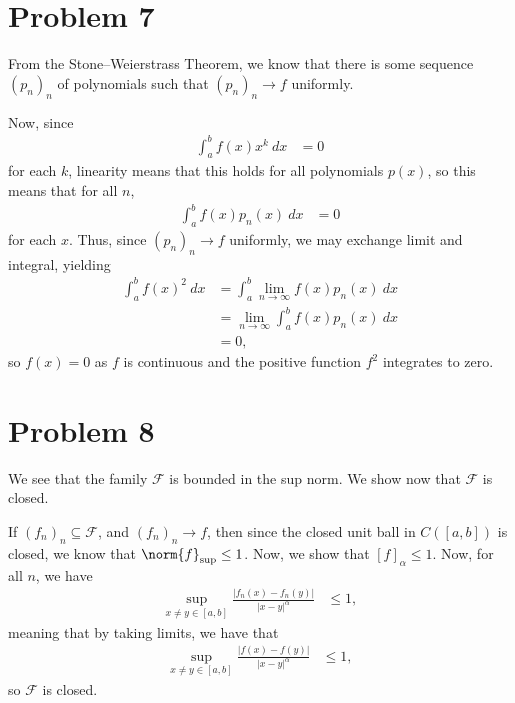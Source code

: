 \documentclass[10pt]{mypackage}
\begin{document}
\RaggedRight
\section{Problem 7}%
From the Stone--Weierstrass Theorem, we know that there is some sequence $\left( p_n \right)_n$ of polynomials such that $\left( p_n \right)_n\rightarrow f$ uniformly.\newline

Now, since
\begin{align*}
  \int_{a}^{b} f(x)x^{k}\:dx &= 0
\end{align*}
for each $k$, linearity means that this holds for all polynomials $p(x)$, so this means that for all $n$,
\begin{align*}
  \int_{a}^{b} f(x)p_n(x)\:dx &= 0
\end{align*}
for each $x$. Thus, since $\left( p_n \right)_n\rightarrow f$ uniformly, we may exchange limit and integral, yielding
\begin{align*}
  \int_{a}^{b} f(x)^2\:dx &= \int_{a}^{b} \lim_{n\rightarrow\infty}f(x)p_n(x)\:dx\\
                          &= \lim_{n\rightarrow\infty} \int_{a}^{b} f(x)p_n(x)\:dx\\
                          &= 0,
\end{align*}
so $f(x) = 0$ as $f$ is continuous and the positive function $f^2$ integrates to zero.
\section{Problem 8}%
We see that the family $\mathcal{F}$ is bounded in the sup norm. We show now that $\mathcal{F}$ is closed.\newline

If $\left( f_n \right)_n\subseteq \mathcal{F}$, and $\left( f_n \right)_n\rightarrow f$, then since the closed unit ball in $C\left( [a,b] \right)$ is closed, we know that $\norm{f}_{\sup} \leq 1$. Now, we show that $\left[ f \right]_{\alpha}\leq 1$. Now, for all $n$, we have
\begin{align*}
  \sup_{x\neq y\in [a,b]} \frac{\left\vert f_n(x)-f_n(y) \right\vert}{\left\vert x-y \right\vert^{\alpha}} &\leq 1,
\end{align*}
meaning that by taking limits, we have that
\begin{align*}
  \sup_{x\neq y\in [a,b]} \frac{\left\vert f(x)-f(y) \right\vert}{\left\vert x-y \right\vert^{\alpha}} &\leq 1,
\end{align*}
so $\mathcal{F}$ is closed.\newline
\end{document}
